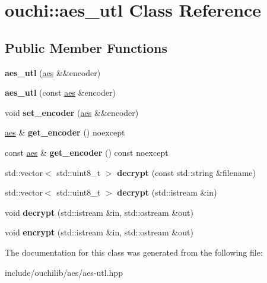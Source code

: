 \hypertarget{classouchi_1_1aes__utl}{}\section{ouchi\+::aes\+\_\+utl Class Reference}
\label{classouchi_1_1aes__utl}
\subsection*{Public Member Functions}
\begin{DoxyCompactItemize}
\item 
\mbox{\label{classouchi_1_1aes__utl_aa10379dc62fc61e4cdd791860d7fc383}} 
{\bfseries aes\+\_\+utl} (\mbox{\hyperlink{classouchi_1_1aes}{aes}} \&\&encoder)
\item 
\mbox{\label{classouchi_1_1aes__utl_a08367f1200c0debc143002ee3d92bee8}} 
{\bfseries aes\+\_\+utl} (const \mbox{\hyperlink{classouchi_1_1aes}{aes}} \&encoder)
\item 
\mbox{\label{classouchi_1_1aes__utl_acda4d7e3bb9ab131091eb1756ce51753}} 
void {\bfseries set\+\_\+encoder} (\mbox{\hyperlink{classouchi_1_1aes}{aes}} \&\&encoder)
\item 
\mbox{\label{classouchi_1_1aes__utl_a335d5f08510f5fbb86eb451cca36177f}} 
\mbox{\hyperlink{classouchi_1_1aes}{aes}} \& {\bfseries get\+\_\+encoder} () noexcept
\item 
\mbox{\label{classouchi_1_1aes__utl_ac51bf8a57b018911eec864aaca7cda01}} 
const \mbox{\hyperlink{classouchi_1_1aes}{aes}} \& {\bfseries get\+\_\+encoder} () const noexcept
\item 
\mbox{\label{classouchi_1_1aes__utl_ae437abba1d35a7e2b21b2a8a124478d4}} 
std\+::vector$<$ std\+::uint8\+\_\+t $>$ {\bfseries decrypt} (const std\+::string \&filename)
\item 
\mbox{\label{classouchi_1_1aes__utl_a5ad4846e3fdb24c5a6fa8bca89d757c0}} 
std\+::vector$<$ std\+::uint8\+\_\+t $>$ {\bfseries decrypt} (std\+::istream \&in)
\item 
\mbox{\label{classouchi_1_1aes__utl_a21cb7e4b9b3d9d3441988bcd1586cdb6}} 
void {\bfseries decrypt} (std\+::istream \&in, std\+::ostream \&out)
\item 
\mbox{\label{classouchi_1_1aes__utl_ab1a4c59686e9513077effdecef0ea81c}} 
void {\bfseries encrypt} (std\+::istream \&in, std\+::ostream \&out)
\end{DoxyCompactItemize}


The documentation for this class was generated from the following file\+:\begin{DoxyCompactItemize}
\item 
include/ouchilib/aes/aes-\/utl.\+hpp\end{DoxyCompactItemize}
